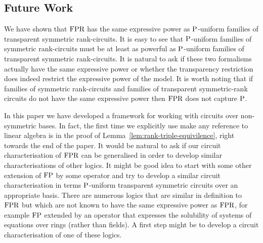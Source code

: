 \documentclass[../paper.tex]{subfiles}
\begin{document}

\subsection{Future Work}
We have shown that $\text{\upshape FPR}$ has the same expressive power as $\mathrm{P}$-uniform
families of transparent symmetric rank-circuits. It is easy to see that
$\mathrm{P}$-uniform families of symmetric rank-circuits must be at least as powerful
as $\mathrm{P}$-uniform families of transparent symmetric rank-circuits. It is natural
to ask if these two formalisms actually have the same expressive power or
whether the transparency restriction does indeed restrict the expressive power
of the model. It is worth noting that if families of symmetric rank-circuits and
families of transparent symmetric-rank circuits do not have the same expressive
power then $\text{\upshape FPR}$ does not capture $\mathrm{P}$.

In this paper we have developed a framework for working with circuits over
non-symmetric bases. In fact, the first time we explicitly use make any
reference to linear algebra is in the proof of
Lemma~\ref{lem:rank-triple-equivilence}, right towards the end of the paper. It
would be natural to ask if our circuit characterisation of $\text{\upshape FPR}$ can be
generalised in order to develop similar characterisations of other logics. It
might be good idea to start with some other extension of $\text{\upshape FP}$ by some operator
and try to develop a similar circuit characterisation in terms $\mathrm{P}$-uniform
transparent symmetric circuits over an appropriate basis. There are numerous
logics that are similar in definition to $\text{\upshape FPR}$ but which are not known to have
the same expressive power as $\text{\upshape FPR}$, for example $\text{\upshape FP}$ extended by an operator
that expresses the solubility of systems of equations over rings (rather than
fields). A first step might be to develop a circuit characterisation of one of
these logics.
\end{document}
